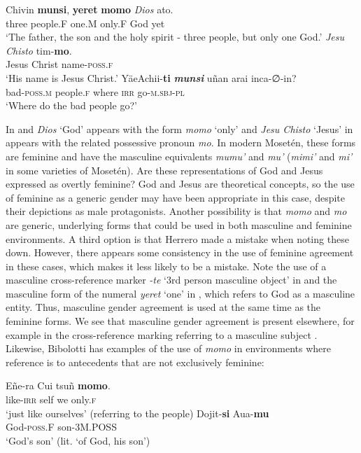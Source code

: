 \documentclass[output=paper,colorlinks,citecolor=brown
]{langscibook}
\begin{document}
     Chivin \textbf{munsi}, 		\textbf{yeret} 	\textbf{momo} 	\emph{Dios} 	ato.\\
    three	people.F	one.M	only.F	God	yet\\
\glt ‘The father, the son and the holy spirit - three people, but only one God.’
\ex \label{sakel_example_8}
\gll \emph{Jesu} \emph{Chisto} 	tim-\textbf{mo}.\\
     Jesus Christ	name-\textsc{poss.f}\\
\glt ‘His name is Jesus Christ.’
\ex \label{sakel_example_9}
\gll YäeAchii-\textbf{ti} 	\textbf{\emph{munsi}} 		uñan 	arai 	inca-∅-in?\\
     bad-\textsc{poss.m}	people.\textsc{f}	where	\textsc{irr}	go-\textsc{m.sbj-pl}\\
\glt ‘Where do the bad people go?’
\z

In  and  \textit{Dios} ‘God’ appears with the form \textit{momo} ‘only’ and \textit{Jesu Chisto} ‘Jesus’ in  appears with the related possessive pronoun \textit{mo}. In modern Mosetén, these forms are feminine and have the masculine equivalents \textit{mumu’} and \textit{mu’} (\textit{mimi’} and \textit{mi’} in some varieties of Mosetén). Are these representations of God and Jesus expressed as overtly feminine? God and Jesus are theoretical concepts, so the use of feminine as a generic gender may have been appropriate in this case, despite their depictions as male protagonists. Another possibility is that \textit{momo} and \textit{mo} are generic, underlying forms that could be used in both masculine and feminine environments. A third option is that Herrero made a mistake when noting these down. However, there appears some consistency in the use of feminine agreement in these cases, which makes it less likely to be a mistake. 
Note the use of a masculine cross-reference marker \textit{-te} ‘3rd person masculine object’ in  and the masculine form of the numeral \textit{yeret} ‘one’ in , which refers to God as a masculine entity. Thus, masculine gender agreement is used at the same time as the feminine forms. We see that masculine gender agreement is present elsewhere, for example in the cross-reference marking referring to a masculine subject . 
Likewise, Bibolotti has examples of the use of \textit{momo} in environments where reference is to antecedents that are not exclusively feminine: 

\ea \label{sakel_example_10}
\gll Eñe-ra 	Cui 	tsuñ 	\textbf{momo}.\\
     like-\textsc{irr}	self	we	only.\textsc{f}\\
\glt ‘just like ourselves’ (referring to the people)
\ex \label{sakel_example_11}
\gll Dojit-\textbf{si} 	Aua-\textbf{mu}\\
     God-\textsc{poss.F}	son-3\textsc{M.POSS}\\
\glt ‘God’s son’ (lit. ‘of God, his son’)
\z	
\end{document}
